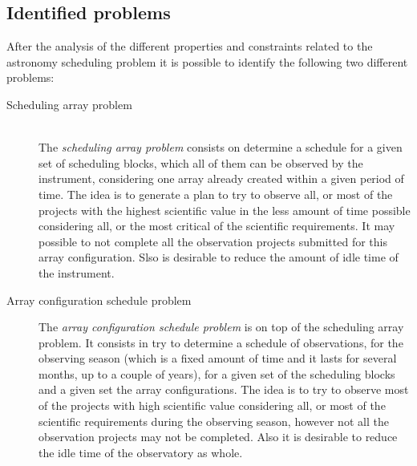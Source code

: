 \subsection{Identified problems}
\label{sec:problems}
After the analysis of the different properties and constraints related to the astronomy scheduling problem it is possible to identify the following two different problems:
\begin{description}

\item[Scheduling array problem] \hfill \\
The \textit{scheduling array problem} consists on determine a schedule for a given set of scheduling blocks, which all of them can be observed by the instrument, considering one array already created within a given period of time. 
The idea is to generate a plan to try to observe all, or most of the projects with the highest scientific value in the less amount of time possible considering all, or the most critical of the scientific requirements. It may possible to not complete all the observation projects submitted for this array configuration. Slso is desirable to reduce the amount of idle time of the instrument.

\item[Array configuration schedule problem]

The \textit{array configuration schedule problem} is on top of the scheduling array problem. It consists in try to determine a schedule of observations, for the observing season (which is a fixed amount of time and it lasts for several months, up to a couple of years), for a given set of the scheduling blocks and a given set the array configurations. The idea is to try to observe most of the projects with high scientific value considering all, or most of the scientific requirements during the observing season, however not all the observation projects may not be completed. Also it is desirable to reduce the idle time of the observatory as whole.
\end{description}


